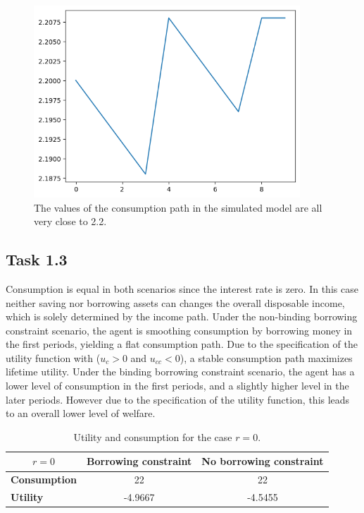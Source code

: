 \documentclass[a4paper, 12pt]{article}
\begin{document}
\begin{figure}[H]
    \centering
    \includegraphics[width = 10cm]{task_1_2.png}
    \caption{The values of the consumption path in the simulated model are all very close to 2.2.}
    \label{fig:graph12}
\end{figure}

\subsection*{Task 1.3}

Consumption is equal in both scenarios since the interest rate is zero. In this case neither saving nor borrowing assets can changes the overall disposable income, which is solely determined by the income path. Under the non-binding borrowing constraint scenario, the agent is smoothing consumption by borrowing money in the first periods, yielding a flat consumption path. Due to the specification of the utility function with ($u_c > 0$ and $u_{cc} < 0$), a stable consumption path maximizes lifetime utility. Under the binding borrowing constraint scenario, the agent has a lower level of consumption in the first periods, and a slightly higher level in the later periods. However due to the specification of the utility function, this leads to an overall lower level of welfare.

\begin{table}[H]
\centering
\begin{tabular}{l|cc}
\multicolumn{1}{c|}{\textbf{$r = 0 $}} & \textbf{Borrowing constraint} & \textbf{No borrowing constraint} \\ \hline
\textbf{Consumption}                   & 22                            & 22                               \\
\textbf{Utility}                       & -4.9667                       & -4.5455                         
\end{tabular}
\caption{Utility and consumption for the case $r = 0$.}
\label{table:r0}
\end{table}
\end{document}

